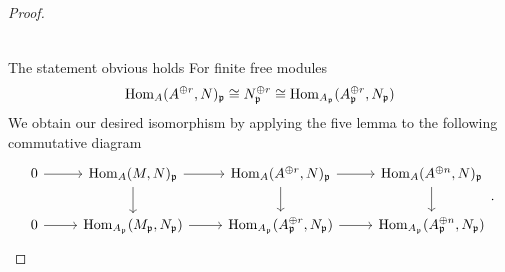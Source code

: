 \documentclass[a4paper]{article}
\begin{document}
\begin{enumerate} [label=\textbf{\arabic*.}, leftmargin=0em]
\begin{proof}
\[\begin{tikzcd}
            \end{tikzcd} \]
          The statement obvious holds For finite free modules
          \begin{equation*}
            \operatorname{Hom}_A(A^{\oplus r}, N)_{\mathfrak{p}} \cong N^{\oplus r}_{\mathfrak{p}} \cong \operatorname{Hom}_{A_{\mathfrak{p}}}(A_{\mathfrak{p}}^{\oplus r}, N_{\mathfrak{p}})
          \end{equation*}
          We obtain our desired isomorphism by applying the five lemma to the following commutative diagram
          \[ \begin{tikzcd}
              0 \arrow[r] & {\Hom_A(M, N)_\goth{p}} \arrow[r] \arrow[d]           & {\Hom_A(A^{\oplus r}, N)_\goth{p}} \arrow[r] \arrow[d] & {\Hom_A(A^{\oplus n}, N)_\goth{p}} \arrow[d]  \\
              0 \arrow[r] & {\Hom_{A_\goth{p}}(M_\goth{p}, N_\goth{p})} \arrow[r] & {\Hom_{A_\goth{p}}(A_\goth{p}^{\oplus r}, N_\goth{p})} \arrow[r] & \Hom_{A_\goth{p}}(A_\goth{p}^{\oplus n}, N_\goth{p})
            \end{tikzcd}. \]
        \end{proof}



\end{enumerate}
\end{document}
